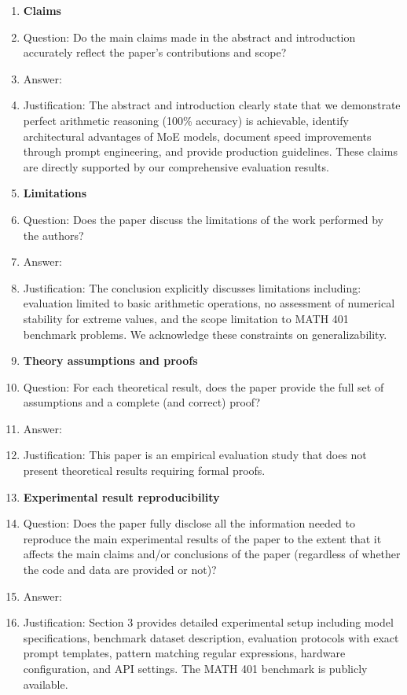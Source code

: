 \documentclass{article}
\begin{document}
\begin{enumerate}

\item {\bf Claims}
    \item[] Question: Do the main claims made in the abstract and introduction accurately reflect the paper's contributions and scope?
    \item[] Answer: \answerYes{}
    \item[] Justification: The abstract and introduction clearly state that we demonstrate perfect arithmetic reasoning (100\% accuracy) is achievable, identify architectural advantages of MoE models, document speed improvements through prompt engineering, and provide production guidelines. These claims are directly supported by our comprehensive evaluation results.

\item {\bf Limitations}
    \item[] Question: Does the paper discuss the limitations of the work performed by the authors?
    \item[] Answer: \answerYes{}
    \item[] Justification: The conclusion explicitly discusses limitations including: evaluation limited to basic arithmetic operations, no assessment of numerical stability for extreme values, and the scope limitation to MATH 401 benchmark problems. We acknowledge these constraints on generalizability.

\item {\bf Theory assumptions and proofs}
    \item[] Question: For each theoretical result, does the paper provide the full set of assumptions and a complete (and correct) proof?
    \item[] Answer: \answerNA{}
    \item[] Justification: This paper is an empirical evaluation study that does not present theoretical results requiring formal proofs.

\item {\bf Experimental result reproducibility}
    \item[] Question: Does the paper fully disclose all the information needed to reproduce the main experimental results of the paper to the extent that it affects the main claims and/or conclusions of the paper (regardless of whether the code and data are provided or not)?
    \item[] Answer: \answerYes{}
    \item[] Justification: Section 3 provides detailed experimental setup including model specifications, benchmark dataset description, evaluation protocols with exact prompt templates, pattern matching regular expressions, hardware configuration, and API settings. The MATH 401 benchmark is publicly available.


\end{enumerate}
\end{document}

